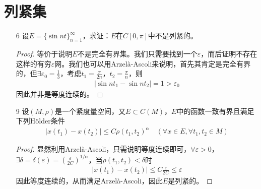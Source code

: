 	\section{列紧集}
	\begin{enumerate}[leftmargin=2cm, label=\arabic*]
		\item[6] 设$E = \{\sin nt\}_{n=1}^{\infty}$，求证：$E$在$C[0,\pi]$中不是列紧的。
		\begin{proof}
			等价于说明$E$不是完全有界集。我们只需要找到一个$\varepsilon$，而后证明不存在这样的有穷$\varepsilon$网。我们也可以用Arzelà-Ascoli来说明，首先其肯定是完全有界的，但$\exists \varepsilon_0 = \frac{1}{3}$，考虑$t_1 = \frac{\pi}{2n}$，$t_2 = \frac{\pi}{n}$，则
			\begin{align*}
				|\sin nt_1 - \sin nt_2| = 1 > \varepsilon_0        
			\end{align*}
			因此并非是等度连续的。
		\end{proof}
		
		\item[9] 设$(M, \rho)$是一个紧度量空间，又$E\subset C(M)$，$E$中的函数一致有界且满足下列Hölder条件
		\begin{align*}
			|x(t_1) - x(t_2) | \leqslant C\rho(t_1,t_2)^{\alpha} \quad (\forall x\in E, \forall t_1, t_2\in M)
		\end{align*}
		\begin{proof}
			显然利用Arzelà-Ascoli，只需说明等度连续即可，$\forall \varepsilon>0$，$\exists \delta = \delta(\varepsilon) = \left( \frac{\varepsilon}{2C}\right)^{1/\alpha}$，当$\rho(t_1,t_2) < \delta$时
			\begin{align*}
				|x(t_1) - x(t_2)| \leqslant C \frac{\varepsilon}{2C} \leqslant \varepsilon
			\end{align*}
			因此等度连续的，从而满足Arzelà-Ascoli，因此$E$是列紧的。
		\end{proof}
	\end{enumerate}
	
